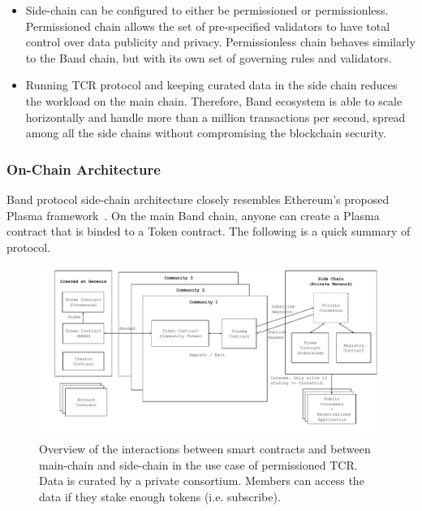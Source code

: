\documentclass[letterpaper,11pt]{article}
\begin{document}
\begin{itemize}
\setlength\itemsep{0em}
\item Side-chain can be configured to either be permissioned or permissionless. Permissioned chain allows the set of pre-specified validators to have total control over data publicity and privacy. Permissionless chain behaves similarly to the Band chain, but with its own set of governing rules and validators.
\item Running TCR protocol and keeping curated data in the side chain reduces the workload on the main chain. Therefore, Band ecosystem is able to scale horizontally and handle more than a million transactions per second, spread among all the side chains without compromising the blockchain security.
\end{itemize}

\subsubsection{On-Chain Architecture}
Band protocol side-chain architecture closely resembles Ethereum’s proposed Plasma framework~\cite{poon2017plasma}. On the main Band chain, anyone can create a Plasma contract that is binded to a Token contract. The following is a quick summary of protocol.

\begin{figure}[ht!]
    \centering
    \includegraphics[width=\textwidth]{plasma}
	\captionsetup{labelformat=empty}
    \caption{Overview of the interactions between smart contracts and between main-chain and side-chain in the use case of permissioned TCR. Data is curated by a private consortium. Members can access the data if they stake enough tokens (i.e. subscribe).}
    \label{fig:plasma}
\end{figure}
\end{document}
